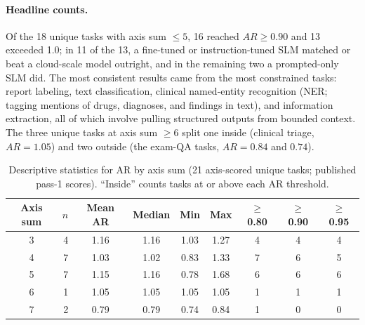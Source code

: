 \documentclass[11pt]{article}
\begin{document}
\paragraph{Headline counts.}
Of the 18 unique tasks with axis sum $\leq 5$, 16 reached $AR \geq 0.90$ and 13 exceeded 1.0; in 11 of the 13, a fine-tuned or instruction-tuned SLM matched or beat a cloud-scale model outright, and in the remaining two a prompted-only SLM did. The most consistent results came from the most constrained tasks: report labeling, text classification, clinical named-entity recognition (NER; tagging mentions of drugs, diagnoses, and findings in text), and information extraction, all of which involve pulling structured outputs from bounded context. The three unique tasks at axis sum $\geq 6$ split one inside (clinical triage, $AR = 1.05$) and two outside (the exam-QA tasks, $AR = 0.84$ and $0.74$).

\begin{table}[ht]
\centering
\small
\caption{Descriptive statistics for AR by axis sum (21 axis-scored unique tasks; published pass-1 scores). ``Inside'' counts tasks at or above each AR threshold.}
\label{tab:descriptives}
\begin{tabular}{@{}crccccccc@{}}
\toprule
Axis sum & $n$ & Mean AR & Median & Min & Max & $\geq$0.80 & $\geq$0.90 & $\geq$0.95 \\
\midrule
3 & 4 & 1.16 & 1.16 & 1.03 & 1.27 & 4 & 4 & 4 \\
4 & 7 & 1.03 & 1.02 & 0.83 & 1.33 & 7 & 6 & 5 \\
5 & 7 & 1.15 & 1.16 & 0.78 & 1.68 & 6 & 6 & 6 \\
6 & 1 & 1.05 & 1.05 & 1.05 & 1.05 & 1 & 1 & 1 \\
7 & 2 & 0.79 & 0.79 & 0.74 & 0.84 & 1 & 0 & 0 \\
\bottomrule
\end{tabular}
\end{table}
\end{document}
